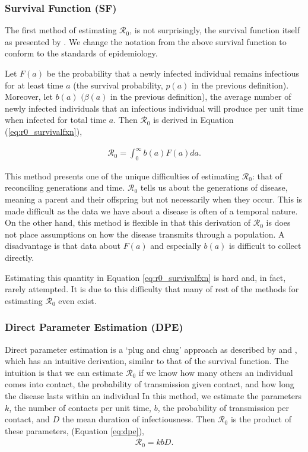\documentclass[12pt]{article}
\newcommand{\rr}{\ensuremath{\mathcal{R}_0}}
\begin{document}
\subsubsection{Survival Function (SF)}
\label{sec:survival_fxn}
The first method of estimating $\rr$, is not surprisingly, the survival function itself as presented by \cite{Heffernan2005}.  We change the notation from the above survival function to conform to the standards of epidemiology.  

Let $F(a)$ be the probability that a newly infected individual remains infectious for at least time $a$ (the survival probability, $p(a)$ in the previous definition).  Moreover, let $b(a)$ $(\beta (a)$ in the previous definition), the average number of newly infected individuals that an infectious individual will produce per unit time when infected for total time $a$.  Then $\rr$ is derived in Equation (\ref{eq:r0_survivalfxn}),

\begin{align}\label{eq:r0_survivalfxn}
  \rr = \int_0^\infty b(a)F(a)da.
\end{align}

This method presents one of the unique difficulties of estimating $\rr$: that of reconciling generations and time.  $\rr$ tells us about the generations of disease, meaning a parent and their offspring but not necessarily when they occur.  This is made difficult as the data we have about a disease is often of a temporal nature.  On the other hand, this method is flexible in that this derivation of $\rr$ is does not place assumptions on how the disease transmits through a population.  A disadvantage is that data about $F(a)$ and especially $b(a)$ is difficult to collect directly.

Estimating this quantity in Equation \ref{eq:r0_survivalfxn} is hard and, in fact, rarely attempted. It is due to this difficulty that many of rest of the methods for estimating $\rr$ even exist.  



\subsubsection{Direct Parameter Estimation (DPE)}
\label{sec:dpe}

Direct parameter estimation is a `plug and chug' approach as described by \cite{lipsitch2003} and \cite{dietz1993estimation}, which has an intuitive derivation, similar to that of the survival function.  The intuition is that we can estimate $\rr$ if we know how many others an individual comes into contact, the probability of transmission given contact, and how long the disease lasts within an individual  In this method, we estimate the parameters $k$, the number of contacts per unit time, $b$, the probability of transmission per contact, and $D$ the mean duration of infectiousness.  Then $\rr$ is the product of these parameters, (Equation \ref{eq:dpe}),
\begin{align}\label{eq:dpe}
\rr = kbD.
\end{align}
\end{document}
